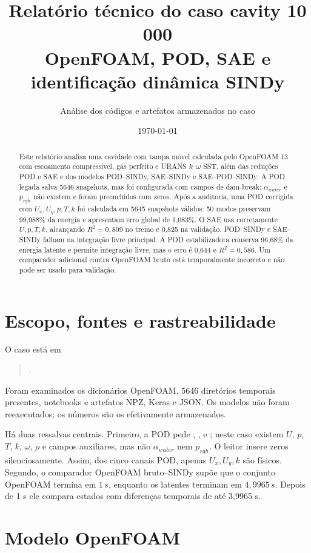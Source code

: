 \documentclass[12pt,a4paper]{article}
\title{\textbf{Relatório técnico do caso cavity 10 000}\\[.4em]OpenFOAM, POD, SAE e identificação dinâmica SINDy}
\author{Análise dos códigos e artefatos armazenados no caso}\date{\today}
\begin{document}
\maketitle
\begin{abstract}
Este relatório analisa uma cavidade com tampa móvel calculada pelo OpenFOAM 13 com escoamento compressível, gás perfeito e URANS $k$--$\omega$ SST, além das reduções POD e SAE e dos modelos POD--SINDy, SAE--SINDy e SAE--POD--SINDy. A POD legada salva 5646 snapshots, mas foi configurada com campos de dam-break: $\alpha_{water}$ e $p_{rgh}$ não existem e foram preenchidos com zeros. Após a auditoria, uma POD corrigida com $U_x,U_y,p,T,k$ foi calculada em 5645 snapshots válidos: 50 modos preservam 99,988\% da energia e apresentam erro global de 1,083\%. O SAE usa corretamente $U,p,T,k$, alcançando $R^2=0,809$ no treino e 0,825 na validação. POD--SINDy e SAE--SINDy falham na integração livre principal. A POD estabilizadora conserva 96,68\% da energia latente e permite integração livre, mas o erro é 0,644 e $R^2=0,586$. Um comparador adicional contra OpenFOAM bruto está temporalmente incorreto e não pode ser usado para validação.
\end{abstract}
\tableofcontents\listoffigures\listoftables\clearpage

\section{Escopo, fontes e rastreabilidade}
O caso está em
\begin{quote}\small{}.\end{quote}
Foram examinados os dicionários OpenFOAM, 5646 diretórios temporais presentes, notebooks e artefatos NPZ, Keras e JSON. Os modelos não foram reexecutados; os números são os efetivamente armazenados.

Há duas ressalvas centrais. Primeiro, a POD pede , ,  e ; neste caso existem $U$, $p$, $T$, $k$, $\omega$, $\rho$ e campos auxiliares, mas não $\alpha_{water}$ nem $p_{rgh}$. O leitor insere zeros silenciosamente. Assim, dos cinco canais POD, apenas $U_x,U_y,k$ são físicos. Segundo, o comparador OpenFOAM bruto--SINDy supõe que o conjunto OpenFOAM termina em $1\,\si{s}$, enquanto os latentes terminam em $4,9965\,\si{s}$. Depois de 1 s ele compara estados com diferenças temporais de até 3,9965 s.

\section{Modelo OpenFOAM}
\end{document}
